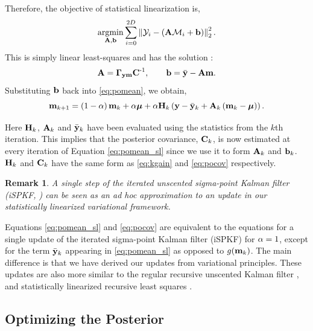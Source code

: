 \documentclass{article} %
\newtheorem{remark}{Remark}
\begin{document}
Therefore, the objective of statistical linearization is,
\begin{equation}
    \argmin_{\Linmat, \intcpt} \sum^{2D}_{i=0} 
        \lnorm{2}{\Sobs_i - \brac{\Linmat\Sfunc_i + \intcpt}}^2.
\end{equation}
This is simply linear least-squares and has the solution \cite{Geist2010}:
\begin{equation}
    \Linmat = \xcov \pocov\inv, \qquad
    \intcpt = \bar\obs - \Linmat\pomean.
\end{equation}
Substituting $\intcpt$ back into \eqref{eq:pomean}, we obtain, 
\begin{equation}
    \pomean_{k+1} = \brac{1-\step}\pomean_k + \step\prmean 
        + \step\Kgain_k\brac{\obs - \bar\obs_k 
        + \Linmat_k\brac{\pomean_k - \prmean}}.
    \label{eq:pomean_sl}
\end{equation}

Here $\Kgain_k$, $\Linmat_k$ and $\bar\obs_k$ have been evaluated using the
statistics from the $k$th iteration. This implies that the posterior
covariance, $\pocov_k$, is now estimated at every iteration of Equation
\eqref{eq:pomean_sl} since we use it to form $\Linmat_k$ and $\intcpt_k$.
$\Kgain_k$ and $\pocov_k$ have the same form as \eqref{eq:kgain} and
\eqref{eq:pocov} respectively. 

\begin{remark}
A single step of the  iterated unscented sigma-point Kalman filter (iSPKF,
\cite{Sibley2006}) can be seen as an ad hoc approximation to an update in our
statistically linearized variational framework. 
\end{remark}

Equations \eqref{eq:pomean_sl} and \eqref{eq:pocov} are equivalent to the
equations for a single update of the iterated sigma-point Kalman filter (iSPKF)
for $\step = 1$, except for the term $\bar\obs_k$ appearing in
\eqref{eq:pomean_sl} as opposed to $\nonlin{\pomean_k}$. The main difference is
that we have derived our updates from  variational principles.
%
These updates are also more similar to the regular recursive unscented Kalman
filter \cite{Julier2004}, and statistically linearized recursive least squares
\cite{Geist2010}.


\subsection{Optimizing the Posterior}
\end{document}
